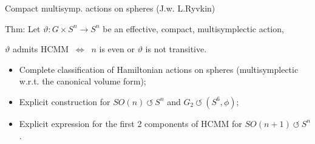 \documentclass[handout,10pt]{beamer}
\begin{document}
\begin{frame}[t]{Compact multisymp. actions on spheres \small (J.w. L.Ryvkin)}
		\begin{tcolorbox}[sidebyside,righthand width=.75\linewidth]
			Thm: \cite{Miti2019}
			\tcblower
			\centering
			\vspace{-.5em}
			Let $\vartheta:G\times S^n \to S^n$ be an effective, compact, multisymplectic action,
				\begin{center}
					\alert{$\vartheta$ admits HCMM $~\Leftrightarrow~$ $n$ is even or $\vartheta$ is not transitive}.
				\end{center}
			\vspace{-.5em}
		\end{tcolorbox}	
		\vfill
		\pause
	\begin{itemize}
		\item[\CheckedBox]  Complete classification of Hamiltonian actions on spheres (multisymplectic w.r.t. the canonical volume form);
		\item[\CheckedBox]  	Explicit construction for 
	$SO(n)~\circlearrowleft~S^{n}$ and
	$G_2~\circlearrowleft~(S^6,\phi)$;
		\item[\CheckedBox]   Explicit expression for the first 2 components of HCMM for 
			$SO(n+1)~\circlearrowleft~S^{n}$.
	\end{itemize}	
		
\end{frame}




\end{document}
